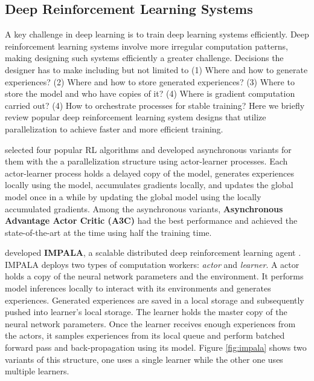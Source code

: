 \cite{RainbowCombiningImprovements_Hessel.Modayil.ea_2018}

\subsection{Deep Reinforcement Learning Systems}
A key challenge in deep learning is to train deep learning systems efficiently.
Deep reinforcement learning systems involve more irregular computation patterns, making designing such systems efficiently a greater challenge.
Decisions the designer has to make including but not limited to (1) Where and how to generate experiences? (2) Where and how to store generated experiences? (3) Where to store the model and who have copies of it? (4) Where is gradient computation carried out? (4) How to orchestrate processes for stable training?
Here we briefly review popular deep reinforcement learning system designs that utilize parallelization to achieve faster and more efficient training.

\citeauthor{AsynchronousMethodsDeep_Mnih.Badia.ea_2016} selected four popular RL algorithms and developed asynchronous variants for them with the a parallelization structure using actor-learner processes.
Each actor-learner process holds a delayed copy of the model, generates experiences locally using the model, accumulates gradients locally, and updates the global model once in a while by updating the global model using the locally accumulated gradients.
Among the asynchronous variants, \textbf{Asynchronous Advantage Actor Critic (A3C)} had the best performance and achieved the state-of-the-art at the time using half the training time.

\citeauthor{IMPALAScalableDistributed_Espeholt.Soyer.ea_2018} developed \textbf{IMPALA}, a scalable distributed deep reinforcement learning agent \cite{IMPALAScalableDistributed_Espeholt.Soyer.ea_2018}.
IMPALA deploys two types of computation workers: \textit{actor} and \textit{learner}.
A actor holds a copy of the neural network parameters and the environment.
It performs model inferences locally to interact with its environments and generates experiences.
Generated experiences are saved in a local storage and subsequently pushed into learner's local storage.
The learner holds the master copy of the neural network parameters.
Once the learner receives enough experiences from the actors, it samples experiences from its local queue and perform batched forward pass and back-propagation using its model.
Figure \ref{fig:impala} shows two variants of this structure, one uses a single learner while the other one uses multiple learners.

